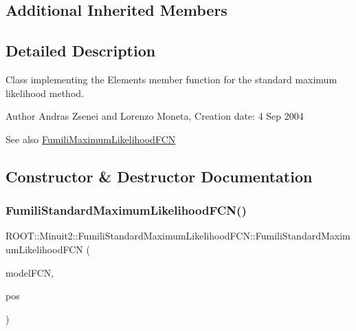 \subsection*{Additional Inherited Members}


\subsection{Detailed Description}
Class implementing the Elements member function for the standard maximum likelihood method.

\begin{DoxyAuthor}{Author}
Andras Zsenei and Lorenzo Moneta, Creation date\+: 4 Sep 2004
\end{DoxyAuthor}
\begin{DoxySeeAlso}{See also}
\mbox{\hyperlink{classROOT_1_1Minuit2_1_1FumiliMaximumLikelihoodFCN}{Fumili\+Maximum\+Likelihood\+F\+CN}} 
\end{DoxySeeAlso}


\subsection{Constructor \& Destructor Documentation}
\mbox{\label{classROOT_1_1Minuit2_1_1FumiliStandardMaximumLikelihoodFCN_af7dc80571b509a0a4f2f7ef821c3b1e6}} 
\subsubsection{\texorpdfstring{FumiliStandardMaximumLikelihoodFCN()}{FumiliStandardMaximumLikelihoodFCN()}\hspace{0.1cm}{\footnotesize\ttfamily [1/6]}}
{\footnotesize\ttfamily R\+O\+O\+T\+::\+Minuit2\+::\+Fumili\+Standard\+Maximum\+Likelihood\+F\+C\+N\+::\+Fumili\+Standard\+Maximum\+Likelihood\+F\+CN (\begin{DoxyParamCaption}\item[{const \mbox{\hyperlink{classROOT_1_1Minuit2_1_1ParametricFunction}{Parametric\+Function}} \&}]{model\+F\+CN,  }\item[{const std\+::vector$<$ double $>$ \&}]{pos }\end{DoxyParamCaption})\hspace{0.3cm}{\ttfamily [inline]}}

